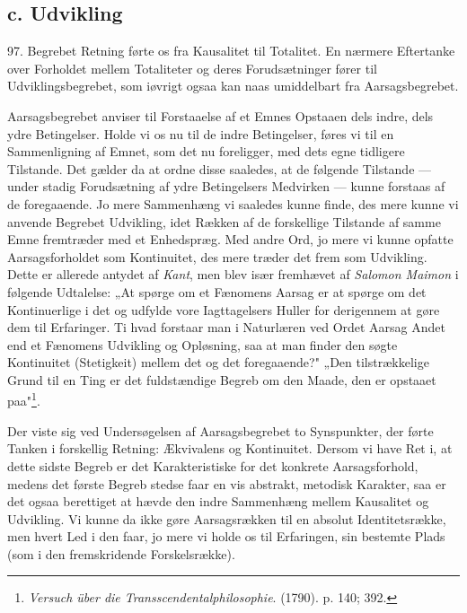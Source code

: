 \documentclass[12pt,a4paper]{book}
\newcommand{\apage}[1]{\marginnote{\footnotesize\textit{[#1]}}}
\begin{document}
\subsection*{c. Udvikling}

97. Begrebet Retning førte os fra Kausalitet til Totalitet. En nærmere Eftertanke
over Forholdet mellem Totaliteter og deres Forudsætninger fører til
Udviklingsbegrebet, som iøvrigt ogsaa kan naas umiddelbart fra Aarsagsbegrebet.

Aarsagsbegrebet anviser til Forstaaelse af et Emnes Opstaaen dels indre, dels ydre
Betingelser. Holde vi os nu til de indre Betingelser, føres vi til en Sammenligning
af Emnet, som det nu foreligger, med dets egne tidligere Tilstande. Det gælder da at
ordne disse saaledes, at de følgende Tilstande --- under stadig Forudsætning af ydre
Betingelsers Medvirken --- kunne forstaas af de foregaaende. Jo mere Sammenhæng vi
saaledes kunne finde, des mere kunne vi anvende Begrebet Udvikling, idet Rækken af
de forskellige Tilstande af samme Emne fremtræder med et Enhedspræg. Med andre Ord,
jo mere vi kunne opfatte Aarsagsforholdet som Kontinuitet, des mere træder det frem
som Udvikling. \apage{228} Dette er allerede antydet af \emph{Kant}, men blev især fremhævet af
\emph{Salomon Maimon} i følgende Udtalelse: „At spørge om et Fænomens Aarsag er at
spørge om det Kontinuerlige i det og udfylde vore Iagttagelsers Huller for
derigennem at gøre dem til Erfaringer. Ti hvad forstaar man i Naturlæren ved Ordet
Aarsag Andet end et Fænomens Udvikling og Opløsning, saa at man finder den søgte
Kontinuitet (Stetigkeit) mellem det og det foregaaende?" „Den tilstrækkelige Grund
til en Ting er det fuldstændige Begreb om den Maade, den er opstaaet
paa"\footnote{\emph{Versuch über die Transscendentalphilosophie}. (1790). p. 140;
392.}.

Der viste sig ved Undersøgelsen af Aarsagsbegrebet to Synspunkter, der førte Tanken
i forskellig Retning: Ækvivalens og Kontinuitet. Dersom vi have Ret i, at dette
sidste Begreb er det Karakteristiske for det konkrete Aarsagsforhold, medens det
første Begreb stedse faar en vis abstrakt, metodisk Karakter, saa er det ogsaa
berettiget at hævde den indre Sammenhæng mellem Kausalitet og Udvikling. Vi kunne da
ikke gøre Aarsagsrækken til en absolut Identitetsrække, men hvert Led i den faar, jo
mere vi holde os til Erfaringen, sin bestemte Plads (som i den fremskridende
Forskelsrække).
\end{document}
